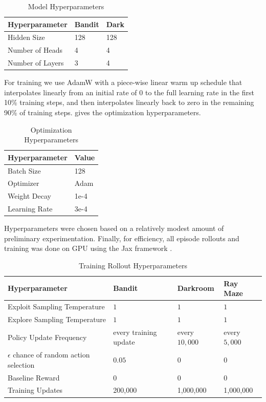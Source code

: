 \documentclass{article}
\begin{document}
\begin{table}[h]
\caption{Model Hyperparameters}
\label{modelhyper}
\centering
\begin{tabular}{lll}
\toprule
Hyperparameter   & Bandit & Dark \\ \midrule
Hidden Size      & 128   &  128\\
Number of Heads  & 4     &  4 \\
Number of Layers & 3      & 4 \\ \bottomrule
\end{tabular}
\end{table}

For training we use AdamW \citep{loshchilov2019decoupled} with a piece-wise linear warm up schedule that interpolates linearly from an initial rate of \(0\) to the full learning rate in the first 10\% training steps, and then interpolates linearly back to zero in the remaining 90\% of training steps.  gives the optimization hyperparameters.

\begin{table}[h]
\caption{Optimization Hyperparameters}
\label{trainhyper}
\centering
\begin{tabular}{ll}
\toprule
Hyperparameter   & Value \\ \midrule
Batch Size      & 128\\
Optimizer  & Adam\\
Weight Decay  &  1e-4\\
Learning Rate & 3e-4 \\ \bottomrule
\end{tabular}
\end{table}

Hyperparameters were chosen based on a relatively modest amount of preliminary experimentation. Finally, for efficiency, all episode rollouts and training was done on GPU using the Jax framework \citep{jax2018github}.

\begin{table}[h]
\caption{Training Rollout Hyperparameters}
\label{rollhyper}
\centering
\begin{tabular}{llll}
\toprule
Hyperparameter   & Bandit & Darkroom & Ray Maze\\ \midrule
Exploit Sampling Temperature & \(1\) & \(1\) & \(1\)\\
Explore Sampling Temperature & \(1\) & \(1\) & \(1\)\\
Policy Update Frequency &  every training update & every \(10,000\) & every \(5,000\)\\
\(\epsilon\) chance of random action selection & \(0.05\) & \(0\) & \(0\)\\
Baseline Reward & \(0\) & \(0\) & \(0\)\\
Training Updates & 200,000 &  1,000,000 &  1,000,000 \\
\bottomrule
\end{tabular}
\label{table:training}
\end{table}
\end{document}
